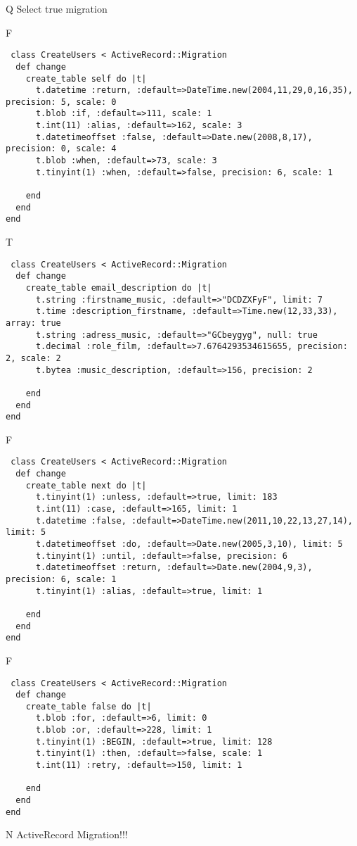 Q
Select true migration

F
\begin{verbatim}
 class CreateUsers < ActiveRecord::Migration 
  def change 
    create_table self do |t| 
      t.datetime :return, :default=>DateTime.new(2004,11,29,0,16,35), precision: 5, scale: 0
      t.blob :if, :default=>111, scale: 1
      t.int(11) :alias, :default=>162, scale: 3
      t.datetimeoffset :false, :default=>Date.new(2008,8,17), precision: 0, scale: 4
      t.blob :when, :default=>73, scale: 3
      t.tinyint(1) :when, :default=>false, precision: 6, scale: 1
   
    end 
  end 
end
\end{verbatim}

T
\begin{verbatim}
 class CreateUsers < ActiveRecord::Migration 
  def change 
    create_table email_description do |t| 
      t.string :firstname_music, :default=>"DCDZXFyF", limit: 7
      t.time :description_firstname, :default=>Time.new(12,33,33), array: true
      t.string :adress_music, :default=>"GCbeygyg", null: true
      t.decimal :role_film, :default=>7.6764293534615655, precision: 2, scale: 2
      t.bytea :music_description, :default=>156, precision: 2
   
    end 
  end 
end
\end{verbatim}

F
\begin{verbatim}
 class CreateUsers < ActiveRecord::Migration 
  def change 
    create_table next do |t| 
      t.tinyint(1) :unless, :default=>true, limit: 183
      t.int(11) :case, :default=>165, limit: 1
      t.datetime :false, :default=>DateTime.new(2011,10,22,13,27,14), limit: 5
      t.datetimeoffset :do, :default=>Date.new(2005,3,10), limit: 5
      t.tinyint(1) :until, :default=>false, precision: 6
      t.datetimeoffset :return, :default=>Date.new(2004,9,3), precision: 6, scale: 1
      t.tinyint(1) :alias, :default=>true, limit: 1
   
    end 
  end 
end
\end{verbatim}

F
\begin{verbatim}
 class CreateUsers < ActiveRecord::Migration 
  def change 
    create_table false do |t| 
      t.blob :for, :default=>6, limit: 0
      t.blob :or, :default=>228, limit: 1
      t.tinyint(1) :BEGIN, :default=>true, limit: 128
      t.tinyint(1) :then, :default=>false, scale: 1
      t.int(11) :retry, :default=>150, limit: 1
   
    end 
  end 
end
\end{verbatim}
N
ActiveRecord Migration!!!
  
